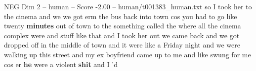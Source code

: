 \begin{textsample}{NEG Dim 2 – human – Score -2.00 – human/t001383\_human.txt}  \label{ex:f2_neg_010}
so I took her to the cinema and we we got erm the bus back into town cos you had to go like twenty \textbf{minutes} out of town to the something called the where all the cinema complex were and stuff like that and I took her out we came back and we got dropped off in the middle of town and it were like a Friday night and we were walking up this street and my ex boyfriend came up to me and like swung for me cos er \textbf{he} were a violent \textbf{shit} and I 'd

\end{textsample}
